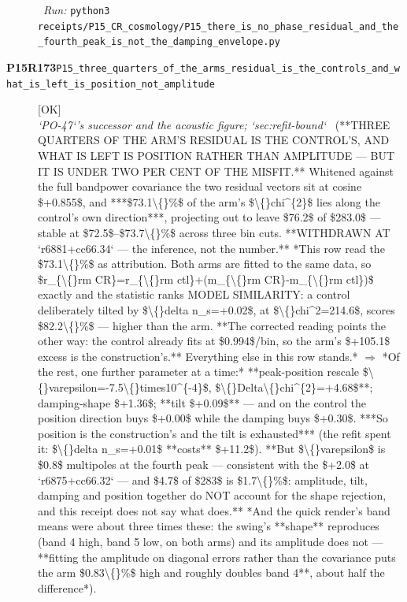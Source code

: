 \begin{description}
\ \emph{Run:} \texttt{python3 receipts/P15\_CR\_cosmology/P15\_there\_is\_no\_phase\_residual\_and\_the\_fourth\_peak\_is\_not\_the\_damping\_envelope.py}
\item[\rcptlabel{P15_three_quarters_of_the_arms_residual_is_the_controls_and_what_is_left_is_position_not_amplitude}{P15R173}\textbf{P15R173}\quad\texttt{P15\_three\_quarters\_of\_the\_arms\_residual\_is\_the\_controls\_and\_what\_is\_left\_is\_position\_not\_amplitude}]\hfill\textsf{[OK]}\\
\textit{`PO-47`'s successor and the acoustic figure; `sec:refit-bound`} \ (**THREE QUARTERS OF THE ARM'S RESIDUAL IS THE CONTROL'S, AND WHAT IS LEFT IS POSITION RATHER THAN AMPLITUDE --- BUT IT IS UNDER TWO PER CENT OF THE MISFIT.** Whitened against the full bandpower covariance the two residual vectors sit at cosine \$+0.855\$, and ***\$73.1\textbackslash\{\}\%\$ of the arm's \$\textbackslash\{\}chi\textasciicircum{}\{2\}\$ lies along the control's own direction***, projecting out to leave \$76.2\$ of \$283.0\$ --- stable at \$72.5\$--\$73.7\textbackslash\{\}\%\$ across three bin cuts.  **WITHDRAWN AT `r6881+cc66.34` --- the inference, not the number.** *This row read the \$73.1\textbackslash\{\}\%\$ as attribution. Both arms are fitted to the same data, so \$r\_\{\textbackslash\{\}rm CR\}=r\_\{\textbackslash\{\}rm ctl\}+(m\_\{\textbackslash\{\}rm CR\}-m\_\{\textbackslash\{\}rm ctl\})\$ exactly and the statistic ranks MODEL SIMILARITY: a control deliberately tilted by \$\textbackslash\{\}delta n\_s=+0.02\$, at \$\textbackslash\{\}chi\textasciicircum{}2=214.6\$, scores \$82.2\textbackslash\{\}\%\$ --- higher than the arm. **The corrected reading points the other way: the control already fits at \$0.994\$/bin, so the arm's \$+105.1\$ excess is the construction's.** Everything else in this row stands.* \ensuremath{\Rightarrow} *Of the rest, one further parameter at a time:* **peak-position rescale \$\textbackslash\{\}varepsilon=-7.5\textbackslash\{\}times10\textasciicircum{}\{-4\}\$, \$\textbackslash\{\}Delta\textbackslash\{\}chi\textasciicircum{}\{2\}=+4.68\$**; damping-shape \$+1.36\$; **tilt \$+0.09\$** --- and on the control the position direction buys \$+0.00\$ while the damping buys \$+0.30\$. ***So position is the construction's and the tilt is exhausted*** (the refit spent it: \$\textbackslash\{\}delta n\_s=+0.01\$ **costs** \$+11.2\$).  **But \$\textbackslash\{\}varepsilon\$ is \$0.8\$ multipoles at the fourth peak --- consistent with the \$+2.0\$ at `r6875+cc66.32` --- and \$4.7\$ of \$283\$ is \$1.7\textbackslash\{\}\%\$: amplitude, tilt, damping and position together do NOT account for the shape rejection, and this receipt does not say what does.**  *And the quick render's band means were about three times these: the swing's **shape** reproduces (band 4 high, band 5 low, on both arms) and its amplitude does not --- **fitting the amplitude on diagonal errors rather than the covariance puts the arm \$0.83\textbackslash\{\}\%\$ high and roughly doubles band 4**, about half the difference*). 

\end{description}
